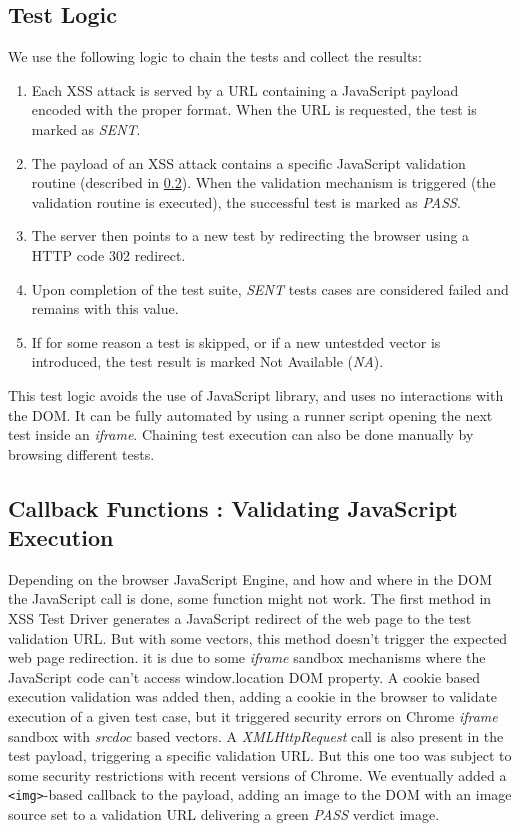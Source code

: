 \documentclass[10pt]{IEEEtran}
\begin{document}
\subsection{Test Logic}
\label{sec:test-logic}
We use the following logic to chain the tests and collect the results:
\begin{enumerate}
    \item Each XSS attack is served by a URL containing a JavaScript payload encoded with the proper format. 
     When the URL is requested, the test is marked as \emph{SENT}.
    \item The payload of an XSS attack contains a specific JavaScript validation routine (described in \ref{magic-payload}). 
  When the validation mechanism is triggered (the validation routine is executed), the successful test is marked as \emph{PASS}.
    \item The server then points to a new test by redirecting the browser using a HTTP code 302 redirect.
  \item Upon completion of the test suite, \emph{SENT} tests cases are considered failed and remains with this value.
  \item If for some reason a test is skipped, or if a new untestded vector is introduced, the test result is marked Not Available (\textit{NA}).
\end{enumerate}
This test logic avoids the use of JavaScript library, and uses no interactions with the DOM.
It can be fully automated by using a runner script opening the next test inside an \emph{iframe}.
Chaining test execution can also be done manually by browsing different tests.




\subsection{Callback Functions : Validating JavaScript Execution}
\label{magic-payload}
        
    Depending on the browser JavaScript Engine, and how and where in the DOM the 
  JavaScript call is done, some function might not work. The first method in 
  XSS Test Driver generates a JavaScript redirect of the web page to the 
  test validation URL. But with some vectors, this method doesn't trigger the 
  expected web page redirection. it is due to some \emph{iframe} sandbox mechanisms 
  where the JavaScript code can't access window.location DOM property.
    A cookie based execution validation was added then, adding a cookie in the 
  browser to validate execution of a given test case, but it triggered security 
  errors on Chrome \emph{iframe} sandbox with \textit{srcdoc} based vectors.
    A \textit{XMLHttpRequest} call is also present in the test payload, triggering 
  a specific validation URL. But this one too was subject to some security 
  restrictions with recent versions of Chrome. 
    We eventually added a \texttt{<img>}-based callback to the payload, adding an 
  image to the DOM with an image source set to a validation URL delivering a 
  green \emph{PASS} verdict image.
    
\end{document}
